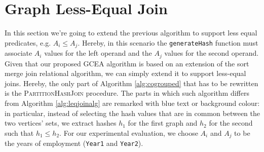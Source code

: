 

\section{Graph Less-Equal Join}\label{sec:lessequaljoin}
In this section we're going to extend the previous algorithm to support less equal predicates, e.g. $A_i\leq A_j$. Hereby, in this scenario the \texttt{generateHash} function must associate $A_i$ values for the left operand and the $A_j$ values for the second operand. Given that our proposed GCEA algorithm is based on an extension of the sort merge join relational algorithm, we can simply extend it to support less-equal joins. Hereby, the only part of Algorithm \ref{alg:cogrouped} that has to be rewritten is the \textsc{PartitionHashJoin} procedure. The parts in which such algorithm differs from Algorithm \ref{alg:leqjoinalg} are remarked with blue text or background colour: in particular, instead of selecting the hash values that are in common between the two vertices' sets, we extract hashes $h_1$ for the first graph and $h_2$ for the second such that $h_1\leq h_2$.  For our experimental evaluation, we choose $A_i$ and $A_j$ to be the years of employment (\texttt{Year1} and \texttt{Year2}).



